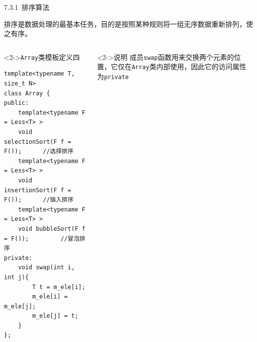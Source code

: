 \begin{frame}[fragile]{7.3.1~排序算法}

排序是数据处理的最基本任务，目的是按照某种规则将一组无序数据重新排列，使之有序。

\vspace{-4mm}
\begin{columns}[t]

\begin{blueblock}<2->{\texttt{Array}类模板定义四}
\vspace{-3mm}
\begin{lstlisting}[moreemph={Array,T}]
template<typename T, size_t N>
class Array {
public:
    template<typename F = Less<T> >
    void selectionSort(F f = F());      //选择排序
    template<typename F = Less<T> >
    void insertionSort(F f = F());      //插入排序
    template<typename F = Less<T> >
    void bubbleSort(F f = F());         //冒泡排序
private:
    void swap(int i, int j){
        T t = m_ele[i];
        m_ele[i] = m_ele[j];
        m_ele[j] = t;
    }
};
\end{lstlisting}
\vspace{-1mm}
\end{blueblock}

\begin{yellowblock}<2->{说明}
成员\texttt{swap}函数用来交换两个元素的位置，它仅在\texttt{Array}类内部使用，因此它的访问属性为\texttt{private}
\end{yellowblock}

\end{columns}

\end{frame}


